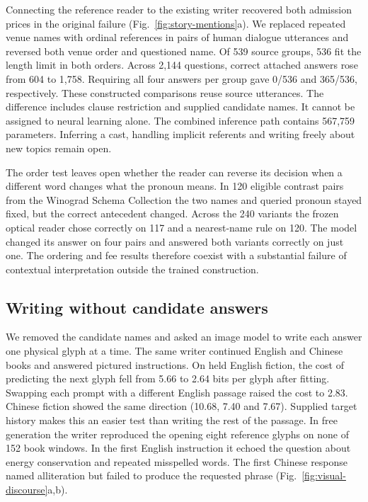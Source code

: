 \documentclass[12pt,a4paper]{article}
\providecommand{\DIFadd}[1]{{\protect\color{blue} \sf #1}} %
\begin{document}
\DIFadd{Connecting the reference reader to the existing writer recovered both admission prices in the original failure (Fig.~\ref{fig:story-mentions}a). We replaced repeated venue names with ordinal references in pairs of human dialogue utterances and reversed both venue order and questioned name. Of 539 source groups, 536 fit the length limit in both orders. Across 2,144 questions, correct attached answers rose from 604 to 1,758. Requiring all four answers per group gave 0/536 and 365/536, respectively. These constructed comparisons reuse source utterances. The difference includes clause restriction and supplied candidate names. It cannot be assigned to neural learning alone. The combined inference path contains 567,759 parameters. Inferring a cast, handling implicit referents and writing freely about new topics remain open.
}

\DIFadd{The order test leaves open whether the reader can reverse its decision when a different word changes what the pronoun means. In 120 eligible contrast pairs from the Winograd Schema Collection the two names and queried pronoun stayed fixed, but the correct antecedent changed. Across the 240 variants the frozen optical reader chose correctly on 117 and a nearest-name rule on 120. The model changed its answer on four pairs and answered both variants correctly on just one. The ordering and fee results therefore coexist with a substantial failure of contextual interpretation outside the trained construction.
}

\subsection*{\DIFadd{Writing without candidate answers}}
\DIFadd{We removed the candidate names and asked an image model to write each answer one physical glyph at a time. The same writer continued English and Chinese books and answered pictured instructions. On held English fiction, the cost of predicting the next glyph fell from 5.66 to 2.64 bits per glyph after fitting. Swapping each prompt with a different English passage raised the cost to 2.83. Chinese fiction showed the same direction (10.68, 7.40 and 7.67). Supplied target history makes this an easier test than writing the rest of the passage. In free generation the writer reproduced the opening eight reference glyphs on none of 152 book windows. In the first English instruction it echoed the question about energy conservation and repeated misspelled words. The first Chinese response named alliteration but failed to produce the requested phrase (Fig.~\ref{fig:visual-discourse}a,b).
}
\end{document}
